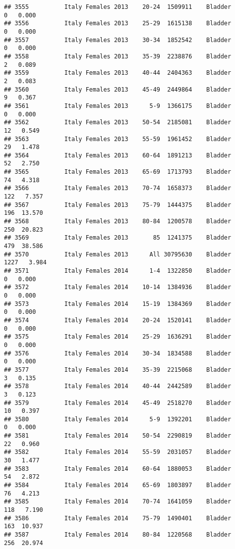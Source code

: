 \documentclass[
]{article}
\begin{document}
\begin{verbatim}
## 3555          Italy Females 2013    20-24  1509911    Bladder      0   0.000
## 3556          Italy Females 2013    25-29  1615138    Bladder      0   0.000
## 3557          Italy Females 2013    30-34  1852542    Bladder      0   0.000
## 3558          Italy Females 2013    35-39  2238876    Bladder      2   0.089
## 3559          Italy Females 2013    40-44  2404363    Bladder      2   0.083
## 3560          Italy Females 2013    45-49  2449864    Bladder      9   0.367
## 3561          Italy Females 2013      5-9  1366175    Bladder      0   0.000
## 3562          Italy Females 2013    50-54  2185081    Bladder     12   0.549
## 3563          Italy Females 2013    55-59  1961452    Bladder     29   1.478
## 3564          Italy Females 2013    60-64  1891213    Bladder     52   2.750
## 3565          Italy Females 2013    65-69  1713793    Bladder     74   4.318
## 3566          Italy Females 2013    70-74  1658373    Bladder    122   7.357
## 3567          Italy Females 2013    75-79  1444375    Bladder    196  13.570
## 3568          Italy Females 2013    80-84  1200578    Bladder    250  20.823
## 3569          Italy Females 2013       85  1241375    Bladder    479  38.586
## 3570          Italy Females 2013      All 30795630    Bladder   1227   3.984
## 3571          Italy Females 2014      1-4  1322850    Bladder      0   0.000
## 3572          Italy Females 2014    10-14  1384936    Bladder      0   0.000
## 3573          Italy Females 2014    15-19  1384369    Bladder      0   0.000
## 3574          Italy Females 2014    20-24  1520141    Bladder      0   0.000
## 3575          Italy Females 2014    25-29  1636291    Bladder      0   0.000
## 3576          Italy Females 2014    30-34  1834588    Bladder      0   0.000
## 3577          Italy Females 2014    35-39  2215068    Bladder      3   0.135
## 3578          Italy Females 2014    40-44  2442589    Bladder      3   0.123
## 3579          Italy Females 2014    45-49  2518270    Bladder     10   0.397
## 3580          Italy Females 2014      5-9  1392201    Bladder      0   0.000
## 3581          Italy Females 2014    50-54  2290819    Bladder     22   0.960
## 3582          Italy Females 2014    55-59  2031057    Bladder     30   1.477
## 3583          Italy Females 2014    60-64  1880053    Bladder     54   2.872
## 3584          Italy Females 2014    65-69  1803897    Bladder     76   4.213
## 3585          Italy Females 2014    70-74  1641059    Bladder    118   7.190
## 3586          Italy Females 2014    75-79  1490401    Bladder    163  10.937
## 3587          Italy Females 2014    80-84  1220568    Bladder    256  20.974

\end{verbatim}
\end{document}
